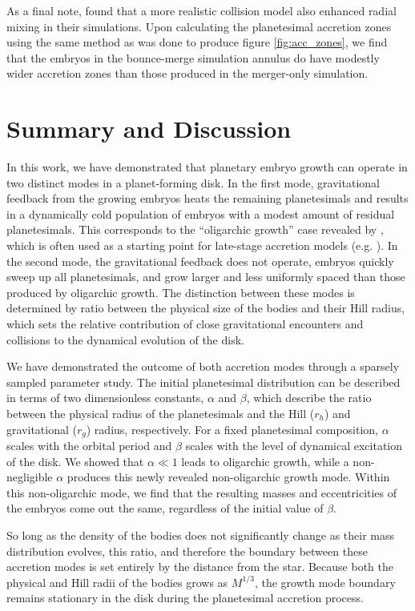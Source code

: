 \documentclass[twocolumn]{aastex63}
\begin{document}
As a final note, \citet{childs22} found that a more realistic collision model also enhanced radial mixing in their simulations. Upon 
calculating the planetesimal accretion zones using the same method as was done to produce figure \ref{fig:acc_zones}, we find 
that the embryos in the bounce-merge simulation annulus do have modestly wider accretion zones than those produced in the 
merger-only simulation.

\section{Summary and Discussion} \label{sec:discuss}

In this work, we have demonstrated that planetary embryo growth
can operate in two distinct modes in a planet-forming disk. In the first
mode, gravitational feedback from the growing embryos heats the
remaining planetesimals and results in a dynamically cold population
of embryos with a modest amount of residual planetesimals. This
corresponds to the ``oligarchic growth'' case revealed by \citep{kokubo98}, which is often used as a starting point for late-stage 
accretion models (e.g. \citet{kokubo02, raymond05, raymond06}). In the second mode, the gravitational feedback does not 
operate, embryos quickly sweep up all planetesimals, and grow larger and less uniformly spaced than those produced by 
oligarchic growth. The distinction between these modes is determined by ratio between the physical size of the bodies and their 
Hill radius, which sets the relative contribution of close gravitational encounters and collisions to the dynamical evolution of the 
disk.

We have demonstrated the outcome of both accretion modes through a
sparsely sampled parameter study. The initial planetesimal distribution can be described in terms of two dimensionless 
constants, $\alpha$ and $\beta$, which describe the ratio between the physical radius of the planetesimals and the Hill ($r_{h}$) 
and gravitational ($r_{g}$) radius, respectively. For a fixed planetesimal composition, $\alpha$ scales with the orbital period and 
$\beta$ scales with the level of dynamical excitation of the disk. We showed that $\alpha \ll 1$ leads to oligarchic growth, while a 
non-negligible $\alpha$ produces this newly revealed non-oligarchic growth mode. Within this non-oligarchic mode, we find that 
the resulting masses and eccentricities of the embryos come out the same, regardless of the initial value of $\beta$.

So long as the density of the bodies does not significantly change as
their mass distribution evolves, this ratio, and therefore the
boundary between these accretion modes is set entirely by the distance
from the star. Because both the physical and Hill radii of the bodies
grows as $M^{1/3}$, the growth mode boundary remains stationary
 in the disk during the planetesimal accretion process.
 
\end{document}
